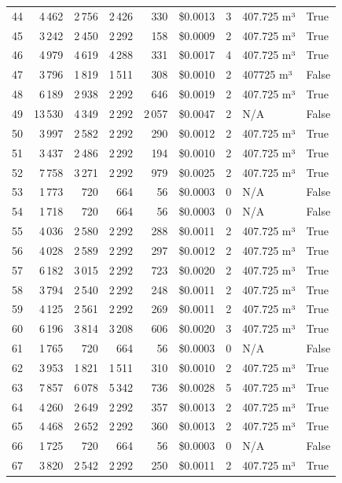 \documentclass[a4paper,11pt]{article}
\begin{document}
\begin{table}[ht]
\begin{tabular}{r r r r r r r p{3cm} l}
44 & 4\,462 & 2\,756 & 2\,426 & 330 & \$0.0013 & 3 & 407.725 m³ & True \\
45 & 3\,242 & 2\,450 & 2\,292 & 158 & \$0.0009 & 2 & 407.725 m³ & True \\
46 & 4\,979 & 4\,619 & 4\,288 & 331 & \$0.0017 & 4 & 407.725 m³ & True \\
47 & 3\,796 & 1\,819 & 1\,511 & 308 & \$0.0010 & 2 & 407725 m³ & False \\
48 & 6\,189 & 2\,938 & 2\,292 & 646 & \$0.0019 & 2 & 407.725 m³ & True \\
49 & 13\,530 & 4\,349 & 2\,292 & 2\,057 & \$0.0047 & 2 & N/A & False \\
50 & 3\,997 & 2\,582 & 2\,292 & 290 & \$0.0012 & 2 & 407.725 m³ & True \\
51 & 3\,437 & 2\,486 & 2\,292 & 194 & \$0.0010 & 2 & 407.725 m³ & True \\
52 & 7\,758 & 3\,271 & 2\,292 & 979 & \$0.0025 & 2 & 407.725 m³ & True \\
53 & 1\,773 & 720 & 664 & 56 & \$0.0003 & 0 & N/A & False \\
54 & 1\,718 & 720 & 664 & 56 & \$0.0003 & 0 & N/A & False \\
55 & 4\,036 & 2\,580 & 2\,292 & 288 & \$0.0011 & 2 & 407.725 m³ & True \\
56 & 4\,028 & 2\,589 & 2\,292 & 297 & \$0.0012 & 2 & 407.725 m³ & True \\
57 & 6\,182 & 3\,015 & 2\,292 & 723 & \$0.0020 & 2 & 407.725 m³ & True \\
58 & 3\,794 & 2\,540 & 2\,292 & 248 & \$0.0011 & 2 & 407.725 m³ & True \\
59 & 4\,125 & 2\,561 & 2\,292 & 269 & \$0.0011 & 2 & 407.725 m³ & True \\
60 & 6\,196 & 3\,814 & 3\,208 & 606 & \$0.0020 & 3 & 407.725 m³ & True \\
61 & 1\,765 & 720 & 664 & 56 & \$0.0003 & 0 & N/A & False \\
62 & 3\,953 & 1\,821 & 1\,511 & 310 & \$0.0010 & 2 & 407.725 m³ & True \\
63 & 7\,857 & 6\,078 & 5\,342 & 736 & \$0.0028 & 5 & 407.725 m³ & True \\
64 & 4\,260 & 2\,649 & 2\,292 & 357 & \$0.0013 & 2 & 407.725 m³ & True \\
65 & 4\,468 & 2\,652 & 2\,292 & 360 & \$0.0013 & 2 & 407.725 m³ & True \\
66 & 1\,725 & 720 & 664 & 56 & \$0.0003 & 0 & N/A & False \\
67 & 3\,820 & 2\,542 & 2\,292 & 250 & \$0.0011 & 2 & 407.725 m³ & True \\

\end{tabular}
\end{table}
\end{document}
